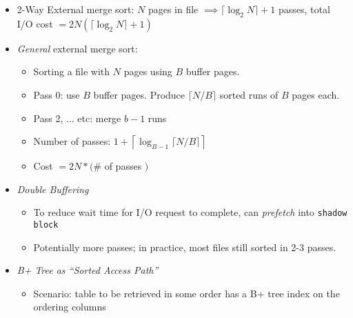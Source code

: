 \documentclass[landscape,8pt]{extarticle}
\newcommand{\code}{\lstinline}
\begin{document}
\begin{multicols}{4}
\begin{itemize}
\begin{itemize}
            \begin{itemize}
                \item Pass 0: read, sort, write $\rightarrow 2^k$ 1-page runs
                \item Pass 1: Read + merge 1-page pairs, write $\rightarrow 2^{k-1}$ 2-page runs
                \item Pass 2: Read + merge 2-page pairs, write $\rightarrow 2^{k-2}$ 4-page runs
                \item Pass $k-1$: Read + merge $2^{k-2}$-page pairs, write $\rightarrow 2 2^{k-1}$-page runs
                \item Pass $k$: Read + merge $2^{k-1}$-page pairs, write $\rightarrow 1 2^k$-page result
            \end{itemize}
            \item 2-Way External merge sort: $N$ pages in file $\implies \lceil \log_2 N \rceil + 1$ passes, total I/O cost $= 2 N \left ( \lceil \log_2 N \rceil + 1 \right )$
            \item \emph{General} external merge sort:
            \begin{itemize}
                \item Sorting a file with $N$ pages using $B$ buffer pages.
                \item Pass 0: use $B$ buffer pages. Produce $\lceil N / B \rceil$ sorted runs of $B$ pages each.
                \item Pass 2, ... etc: merge $b - 1$ runs
                \item Number of passes: $1 + \left \lceil \log_{B-1} \lceil N / B \rceil \right \rceil $
                \item Cost $= 2N * ($\# of passes $)$
            \end{itemize}
            \item \emph{Double Buffering}
            \begin{itemize}
                \item To reduce wait time for I/O request to complete, can \emph{prefetch} into \code{shadow block}
                \item Potentially more passes; in practice, most files still sorted in 2-3 passes.
            \end{itemize}
            \item \emph{B+ Tree as ``Sorted Access Path''}
            \begin{itemize}
                \item Scenario: table to be retrieved in some order has a B+ tree index on the ordering columns

\end{itemize}
\end{itemize}
\end{itemize}
\end{multicols}
\end{document}
